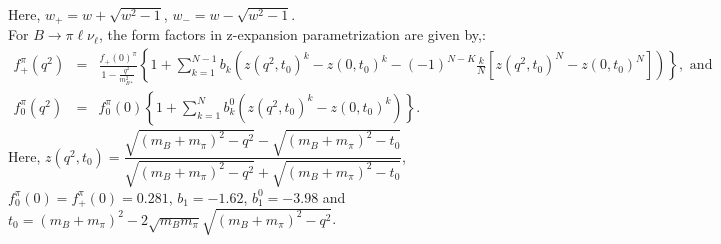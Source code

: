 \documentclass[a4paper,11pt]{article}
\begin{document}
	Here, $w_{+}=w+\sqrt{w^{2}-1}$, $w_{-}=w-\sqrt{w^{2}-1}$.\\
	For $B\to \pi \ell \nu_{\ell}$, the form factors in z-expansion parametrization are given by,\cite{Khodjamirian:2011ub}:
		\begin{eqnarray}
		f_+^\pi(q^2)&=&\frac{f_+(0)^\pi}{1-\frac{q^2}{m_{B*}^2}}\left\lbrace 1+ \sum_{k=1}^{N-1} b_k \left(z(q^2,t_0)^k-z(0,t_0)^k-(-1)^{N-K}\frac{k}{N}\left[z(q^2,t_0)^N-z(0,t_0)^N\right] \right)\right\rbrace, \text{ and}\nonumber\\
		f_0^\pi(q^2)&=&f_0^\pi(0)\left\lbrace 1+ \sum_{k=1}^{N} b_k^0 \left(z(q^2,t_0)^k-z(0,t_0)^k\right)\right\rbrace.\nonumber
		\end{eqnarray}
	Here,	$z(q^2,t_0)=\dfrac{\sqrt{(m_B+m_\pi)^2-q^2}-\sqrt{(m_B+m_\pi)^2-t_0}}{\sqrt{(m_B+m_\pi)^2-q^2}+\sqrt{(m_B+m_\pi)^2-t_0}}$, $f_{0}^{\pi}(0)=f_{+}^{\pi}(0)=0.281$, $b_1=-1.62$, $b_1^0=-3.98$ and $	t_0=(m_B+m_\pi)^2-2\sqrt{m_B m_\pi}\sqrt{(m_B+m_\pi)^2-q^2}$.
\end{document}
